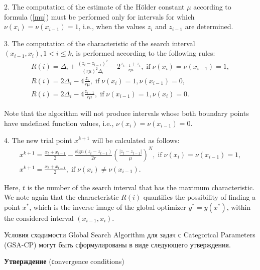 \documentclass[preprint,12pt]{elsarticle}
\begin{document}
2. The computation of the estimate of the H\"older constant $\mu$ according to formula (\ref{mu}) must be performed only for intervals for which $\nu(x_i) = \nu(x_{i-1}) = 1$, i.e., when the values $z_i$ and $z_{i-1}$ are determined.

3. The computation of the characteristic of the search interval $(x_{i-1},x_i), 1<i\leq k$, is performed according to the following rules:
\begin{gather}\label{R_int}
R(i) = \Delta_i + \frac{(z_i-z_{i-1})^2}{(r\mu)^2\Delta_i}-2\frac{z_{i-1}+z_i}{r\mu}, \; \mathrm{if} \; \nu(x_i) = \nu(x_{i-1}) = 1, \nonumber \\ 
R(i) = 2\Delta_i-4\frac{z_i}{r\mu}, \; \mathrm{if} \;  \nu(x_i) = 1, \nu(x_{i-1}) = 0, \nonumber \\ 
R(i) = 2\Delta_i-4\frac{z_{i-1}}{r\mu}, \; \mathrm{if} \;  \nu(x_{i-1}) = 1, \nu(x_{i}) = 0. \nonumber
\end{gather}

Note that the algorithm will not produce intervals whose both boundary points have undefined function values, i.e., $\nu(x_i) = \nu(x_{i-1}) = 0$.

4. The new trial point $x^{k+1}$ will be calculated as follows:
\begin{gather}\label{xk1_int}
x^{k+1} = \frac{x_t+x_{t-1}}{2}- \frac{\mathrm{sign}(z_t-z_{t-1})}{2r} \left(\frac{\left|z_t-z_{t-1}\right|}{\mu}\right)^N, \; \mathrm{if} \; \nu(x_i) = \nu(x_{i-1}) = 1, \nonumber \\    
x^{k+1} = \frac{x_t+x_{t-1}}{2} , \; \mathrm{if} \; \nu(x_i) \neq \nu(x_{i-1}). \nonumber
\end{gather}

Here, $t$ is the number of the search interval that has the maximum characteristic.
We note again that the characteristic $R(i)$ quantifies the possibility of finding a point $x^*$, which is the inverse image of the global optimizer $y^* = y(x^*)$, within the considered interval $(x_{i-1},x_i)$.

\textcolor[rgb]{1,0,0}{Условия сходимости Global Search Algorithm для задач с Categorical Parameters (GSA-CP) могут быть сформулированы в виде следующего утверждения.}

\textbf{Утверждение} (сonvergence conditions)
\end{document}
